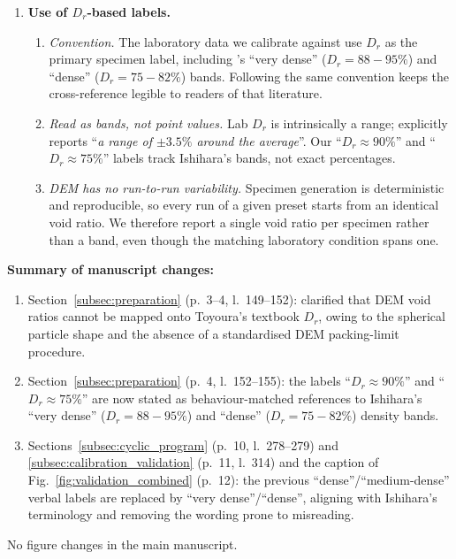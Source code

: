 \documentclass[11pt,a4paper]{article}
\newcommand{\changed}[1]{\par\noindent\textbf{Summary of manuscript changes:}\ #1\par}
\newcommand{\manref}[1]{(#1)}                  %
\begin{document}
\begin{enumerate}[leftmargin=*,label=(\arabic*),topsep=4pt,itemsep=6pt]
\item \textbf{Use of $D_r$-based labels.}
\begin{enumerate}[leftmargin=2em,label=(\alph*),topsep=2pt,itemsep=3pt]
  \item \emph{Convention.} The laboratory data we calibrate against use $D_r$ as the primary specimen label, including \citet{Ishihara1985}'s ``very dense'' ($D_r = 88\!-\!95\%$) and ``dense'' ($D_r = 75\!-\!82\%$) bands. Following the same convention keeps the cross-reference legible to readers of that literature.
  \item \emph{Read as bands, not point values.} Lab $D_r$ is intrinsically a range; \citet[p.~68]{Ishihara1985} explicitly reports ``\emph{a range of $\pm 3.5\%$ around the average}''. Our ``$D_r \approx 90\%$'' and ``$D_r \approx 75\%$'' labels track Ishihara's bands, not exact percentages.
  \item \emph{DEM has no run-to-run variability.} Specimen generation is deterministic and reproducible, so every run of a given preset starts from an identical void ratio. We therefore report a single void ratio per specimen rather than a band, even though the matching laboratory condition spans one.
\end{enumerate}
\end{enumerate}

\changed{
\begin{enumerate}[leftmargin=*,label=(\alph*),topsep=2pt,itemsep=2pt]
  \item Section~\ref{subsec:preparation} \manref{p.~3--4, l.~149--152}: clarified that DEM void ratios cannot be mapped onto Toyoura's textbook $D_r$, owing to the spherical particle shape and the absence of a standardised DEM packing-limit procedure.
  \item Section~\ref{subsec:preparation} \manref{p.~4, l.~152--155}: the labels ``$D_r \approx 90\%$'' and ``$D_r \approx 75\%$'' are now stated as behaviour-matched references to Ishihara's ``very dense'' ($D_r = 88\!-\!95\%$) and ``dense'' ($D_r = 75\!-\!82\%$) density bands.
  \item Sections~\ref{subsec:cyclic_program} \manref{p.~10, l.~278--279} and \ref{subsec:calibration_validation} \manref{p.~11, l.~314} and the caption of Fig.~\ref{fig:validation_combined} \manref{p.~12}: the previous ``dense''/``medium-dense'' verbal labels are replaced by ``very dense''/``dense'', aligning with Ishihara's terminology and removing the wording prone to misreading.
\end{enumerate}
No figure changes in the main manuscript.}
\end{document}
